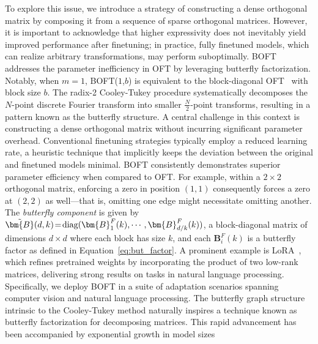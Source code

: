 To explore this issue, we introduce a strategy of constructing a dense orthogonal matrix by composing it from a sequence of sparse orthogonal matrices. However, it is important to acknowledge that higher expressivity does not inevitably yield improved performance after finetuning; in practice, fully finetuned models, which can realize arbitrary transformations, may perform suboptimally. BOFT addresses the parameter inefficiency in OFT by leveraging butterfly factorization. Notably, when $m=1$, BOFT($1$,$b$) is equivalent to the block-diagonal OFT~\cite{qiu2023controlling} with block size $b$. The radix-2 Cooley-Tukey procedure systematically decomposes the $N$-point discrete Fourier transform into smaller $\frac{N}{2}$-point transforms, resulting in a pattern known as the butterfly structure. A central challenge in this context is constructing a dense orthogonal matrix without incurring significant parameter overhead. Conventional finetuning strategies typically employ a reduced learning rate, a heuristic technique that implicitly keeps the deviation between the original and finetuned models minimal. BOFT consistently demonstrates superior parameter efficiency when compared to OFT. For example, within a $2\times2$ orthogonal matrix, enforcing a zero in position $(1,1)$ consequently forces a zero at $(2,2)$ as well—that is, omitting one edge might necessitate omitting another. The \emph{butterfly component} is given by $\thickmuskip=2mu \medmuskip=2mu \tilde{\bm{B}}(d,k)=\text{diag}(\bm{B}^F_1(k),\cdots,\bm{B}^F_{d/k}(k))$, a block-diagonal matrix of dimensions $d\times d$ where each block has size $k$, and each $\bm{B}^F_i(k)$ is a butterfly factor as defined in Equation~\ref{eq:but_factor}. A prominent example is LoRA~\cite{hulora2022}, which refines pretrained weights by incorporating the product of two low-rank matrices, delivering strong results on tasks in natural language processing. Specifically, we deploy BOFT in a suite of adaptation scenarios spanning computer vision and natural language processing. The butterfly graph structure intrinsic to the Cooley-Tukey method naturally inspires a technique known as butterfly factorization for decomposing matrices. This rapid advancement has been accompanied by exponential growth in model sizes

